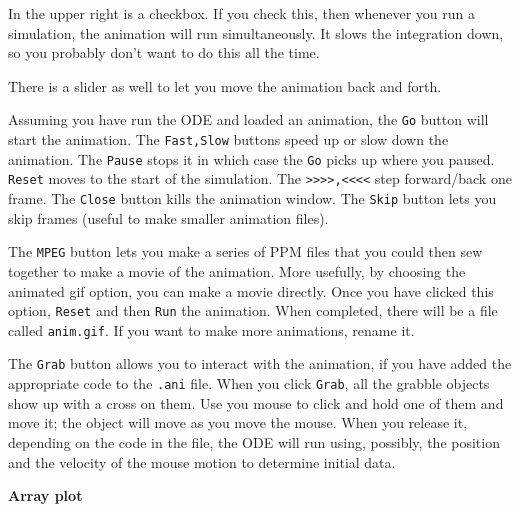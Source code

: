 \documentclass{article}
\begin{document}
In the upper right is a checkbox. If you check this, then whenever you run a simulation, the animation will run simultaneously. It slows the integration down, so you probably don't want to do this all the time.

There is a slider as well to let you move the animation back and forth.


 Assuming you have run the ODE and loaded an animation, the {\tt Go} button will start the animation. The {\tt Fast,Slow} buttons speed up or slow down the animation. The {\tt Pause} stops it in which case the {\tt Go} picks up where you paused. {\tt Reset} moves to the start of the simulation. The {\tt >>>>,<<<<} step forward/back one frame.  The {\tt Close} button kills the animation window.  The {\tt Skip} button lets you skip frames (useful to make smaller animation files).

The {\tt MPEG} button lets you make a series of PPM files that you could then sew together to make a movie of the animation. More usefully, by choosing the animated gif option, you can make a movie directly. Once you have clicked this option, {\tt Reset} and then {\tt Run} the animation. When completed, there will be a file called {\tt anim.gif}. If you want to make more animations, rename it.  

The {\tt Grab} button allows you to interact with the animation, if you have added the appropriate code to the {\tt .ani} file.  When you click {\tt Grab}, all the grabble objects show up with a cross on them. Use you mouse to click and hold one of them and move it; the object will move as you move the mouse. When you release it, depending on the code in the file, the ODE will run using, possibly, the position and the velocity of the mouse motion to determine initial data.    

\bigskip
{\Large \bf Array plot}
\end{document}
